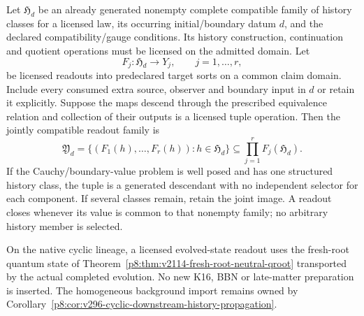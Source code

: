 \documentclass[12pt,a4paper]{article}
\begin{document}
\begin{corollary}
\label{p9:cor:common-history-readout-tuple}
Let $\mathfrak H_d$ be an already generated nonempty complete compatible
family of history classes for a licensed law, its occurring initial/boundary
datum $d$, and the declared compatibility/gauge conditions.  Its history
construction, continuation and quotient operations must be licensed on the
admitted domain.  Let
\[
 F_j:\mathfrak H_d\longrightarrow Y_j,\qquad j=1,\ldots,r,
\]
be licensed readouts into predeclared target sorts on a common claim domain.
Include every consumed extra
source, observer and boundary input in $d$ or retain it explicitly.  Suppose
the maps descend through the prescribed equivalence relation and collection
of their outputs is a licensed tuple operation.  Then the jointly compatible
readout family is
\[
 \boxed{\mathfrak Y_d
 =\{(F_1(h),\ldots,F_r(h)):h\in\mathfrak H_d\}
 \subseteq\prod_{j=1}^rF_j(\mathfrak H_d).}
\]
If the Cauchy/boundary-value problem is well posed and has one structured
history class, the tuple is a generated descendant with no independent
selector for each component.  If several classes remain, retain the joint
image.  A readout closes whenever its value is common to that nonempty
family; no arbitrary history member is selected.

On the native cyclic lineage, a licensed evolved-state readout uses the
fresh-root quantum state of
Theorem~\ref{p8:thm:v2114-fresh-root-neutral-qroot} transported by the actual
completed evolution.  No new K16, BBN or late-matter preparation is inserted.
The homogeneous background import remains owned by
Corollary~\ref{p8:cor:v296-cyclic-downstream-history-propagation}.
\end{corollary}
\end{document}

